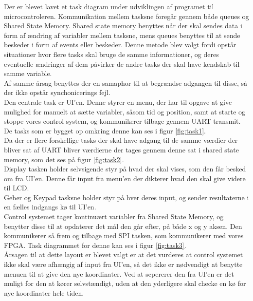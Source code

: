 Der er blevet lavet et task diagram under udviklingen af programet til microcontroleren. Kommunikation mellem tasksne foregår gennem både queues og Shared State Memory. Shared state memory benyttes når der skal sendes data i form af ændring af variabler mellem tasksne, mens queues benyttes til at sende beskeder i form af events eller beskeder. Denne metode blev valgt fordi opstår situationer hvor flere tasks skal bruge de samme informationer, og deres eventuelle ændringer af dem påvirker de andre tasks der skal have kendskab til samme variable.
\\
Af samme årsag benyttes der en samaphor til at begrændse adgangen til disse, så der ikke opstår synchonicerings fejl.
\\
Den centrale task er UI'en. Denne styrer en menu, der har til opgave at give mulighed for manuelt at sætte variabler, såsom tid og position, samt at starte og stoppe vores control system, og kommunikerer tilbage gennem UART transmit. De tasks som er bygget op omkring denne kan ses i figur \ref{fig:task1}.
\\
Da der er flere forskellige tasks der skal have adgang til de samme værdier der bliver sat af UART bliver værdierne der tages gennem denne sat i shared state memory, som det ses på figur \ref{fig:task2}.
\\
Display tasken holder selvsigende styr på hvad der skal vises, som den får besked om fra UI'en. Denne får input fra menu'en der dikterer hvad den skal give videre til LCD.
\\
Geber og Keypad tasksne holder styr på hver deres input, og sender resultaterne i en fælles indgangs kø til UI'en.
\\
Control systemet tager kontinuært variabler fra Shared State Memory, og benytter disse til at opdaterer det mål den går efter, på både x og y aksen. Den kommunikerer så frem og tilbage med SPI tasken, som kommunikerer med vores FPGA. Task diagrammet for denne kan ses i figur \ref{fig:task3}.
\\
Årsagen til at dette layout er blevet valgt er at det vurderes at control systemet ikke skal være afhængig af input fra UI'en, så det ikke er nødvendigt at benytte menuen til at give den nye koordinater. Ved at sepererer den fra UI'en er det muligt for den at kører selvstændigt, uden at den yderligere skal checke en kø for nye koordinater hele tiden.

